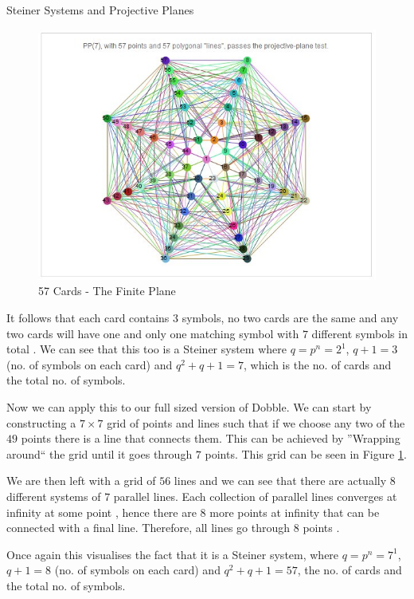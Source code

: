 \documentclass[final]{beamer}
\newlength{\colwidth}
\begin{document}
\begin{frame}[t]
\begin{columns}[t]
\begin{column}{\colwidth}
\begin{block}{Steiner Systems and Projective Planes}
\begin{multicols}{2}
\begin{figure}
    \includegraphics[width=13cm]{pporder7}
    \caption{57 Cards - The Finite Plane \cite{beresford2011}}
    \label{fig:pporder7}
\end{figure}
    \end{multicols}
  
    It follows that each card contains $3$ symbols, no two cards are the same and any two cards will have one and only one matching symbol with $7$ different symbols in total \cite{westenbrink2022}.
    We can see that this too is a Steiner system where $q = p^n = 2^1$, $q + 1 = 3$ (no. of symbols on each card) and $q^2 + q + 1 = 7$, which is the no. of cards and the total no. of symbols.
    
    Now we can apply this to our full sized version of Dobble. We can start by constructing a $7\times7$ grid of points and lines such that if we choose any two of the $49$ points there is a line that connects them. This can be achieved by ''Wrapping around`` the grid until it goes through $7$ points. This grid can be seen in Figure \ref{fig:pporder7}.

    We are then left with a grid of $56$ lines and we can see that there are actually $8$ different systems of $7$ parallel lines. Each collection of parallel lines converges at infinity at some point \cite{spencer1999}, hence there are $8$ more points at infinity that can be connected with a final line. Therefore, all lines go through $8$ points \cite{Parker2021}.

    Once again this visualises the fact that it is a Steiner system, where $q = p^n = 7^1$, $q + 1 = 8$ (no. of symbols on each card) and $q^2 + q + 1 = 57$, the no. of cards and the total no. of symbols. 


\end{block}
\end{column}
\end{columns}
\end{frame}
\end{document}
